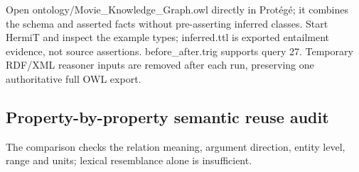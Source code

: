 \documentclass[
  11pt,
]{article}
\begin{document}
Open
ontology\allowbreak{}/\allowbreak{}\allowbreak{}Movie\_\allowbreak{}\allowbreak{}K\allowbreak{}nowledge\allowbreak{}\_\allowbreak{}\allowbreak{}Graph.\allowbreak{}o\allowbreak{}wl
directly in Protégé; it combines the schema and asserted facts without
pre-\allowbreak{}asse\allowbreak{}rting inferred classes. Start HermiT
and inspect the example types; inferred.ttl is exported entailment
evidence, not source assertions.
before\_\allowbreak{}a\allowbreak{}fter.\allowbreak{}tri\allowbreak{}g
supports query 27. Temporary RDF/XML reasoner inputs are removed after
each run, preserving one authorit\allowbreak{}ative full OWL export.

\subsection{\texorpdfstring{Property\allowbreak{}-\allowbreak{}by-\allowbreak{}prop\allowbreak{}erty
semantic reuse
audit}{ semantic reuse audit}}\label{property-by-property-semantic-reuse-audit}

The comparison checks the relation meaning, argument direction, entity
level, range and units; lexical resemblance alone is
insuffic\allowbreak{}ient.\allowbreak{}
\end{document}
